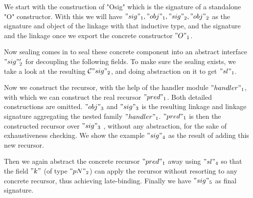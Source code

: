 We start with the construction of "Osig" which is the signature of a
standalone "O" constructor. With this we will have $"sig"_1, "obj"_1,
"sig"_2, "obj"_2$ as the signature and object of the linkage with that
inductive type, and the signature and the linkage once we export the
concrete constructor $"O"_1$. 

Now sealing comes in to seal these concrete component into an abstract
interface $"sig"_2'$ for decoupling the following fields. To make sure
the sealing exists, we take a look at the resulting ${\mathcal{C}} "sig"_2$, and
doing abstraction on it to get $"sl"_1$. 

Now we construct the recursor, with the help of the handler module
$"handler"_1$, with which we can construct the real recursor $"pred"_1$.
Both detailed constructions are omitted. $"obj"_3$ and $"sig"_3$ is the resulting linkage and linkage signature aggregating the nested family $"handler"_1$. $"pred"_1$ is then the constructed recursor over $"sig"_3$ , without any abstraction, for the sake of exhaustiveness checking. We show the example $"sig"_4$ as the result of adding this new recursor. 

Then we again abstract the concrete recursor $"pred"_1$ away using $"sl"_4$ so that the field $"k"$ (of type $"pN"_2$)
can apply the recursor without resorting to any concrete recursor, thus achieving late-binding. Finally we
have $"sig"_5$ as final signature. 

